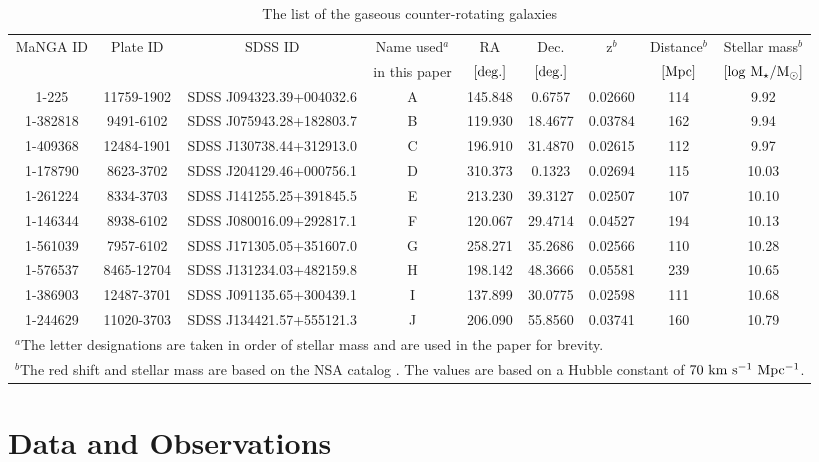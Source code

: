 \documentclass[fleqn,usenatbib]{mnras}
\begin{document}
\begin{table}
\centering
\caption{The list of the gaseous counter-rotating galaxies}
\label{tab:list}
\begin{tabular}{ccccccccc}

\hline
MaNGA ID & Plate ID & SDSS ID &
Name used$^{a}$ &
RA & Dec. & z$^{b}$ &
Distance$^{b}$ &
Stellar mass$^{b}$\\
& & & in this paper & 
$\rm [deg.]$ & $\rm [deg.]$ &  & $\rm [Mpc]$  & $\rm[log~ M_{\star}/M_{\odot}]$ \\
\hline
1-225    & 11759-1902 & SDSS J094323.39+004032.6 & A & 145.848 &  0.6757 & 0.02660 & 114 & 9.92 \\
1-382818 & 9491-6102  & SDSS J075943.28+182803.7 & B & 119.930 & 18.4677 & 0.03784 & 162 & 9.94 \\
1-409368 & 12484-1901 & SDSS J130738.44+312913.0 & C & 196.910 & 31.4870 & 0.02615 & 112 & 9.97 \\
1-178790 & 8623-3702  & SDSS J204129.46+000756.1 & D & 310.373 &  0.1323 & 0.02694 & 115 & 10.03 \\
1-261224 & 8334-3703  & SDSS J141255.25+391845.5 & E & 213.230 & 39.3127 & 0.02507 & 107 & 10.10 \\
1-146344 & 8938-6102  & SDSS J080016.09+292817.1 & F & 120.067 & 29.4714 & 0.04527 & 194 & 10.13 \\
1-561039 & 7957-6102  & SDSS J171305.05+351607.0 & G & 258.271 & 35.2686 & 0.02566 & 110 & 10.28 \\
1-576537 & 8465-12704 & SDSS J131234.03+482159.8 & H & 198.142 & 48.3666 & 0.05581 & 239 & 10.65 \\
1-386903 & 12487-3701 & SDSS J091135.65+300439.1 & I & 137.899 & 30.0775 & 0.02598 & 111 & 10.68 \\
1-244629 & 11020-3703 & SDSS J134421.57+555121.3 & J & 206.090 & 55.8560 & 0.03741 & 160 & 10.79 \\
\hline
\multicolumn{9}{l}{$^{a}$The letter designations are taken in order of stellar mass and are used in the paper for brevity.}\\
\multicolumn{9}{l}{$^{b}$The red shift and stellar mass are based on the NSA catalog \citep{NSA}. The values are based on a Hubble constant of $\rm 70~km~s^{-1}~Mpc^{-1}$.}\\
\end{tabular}
\end{table}



\section{Data and Observations} \label{sec:data}
\end{document}
